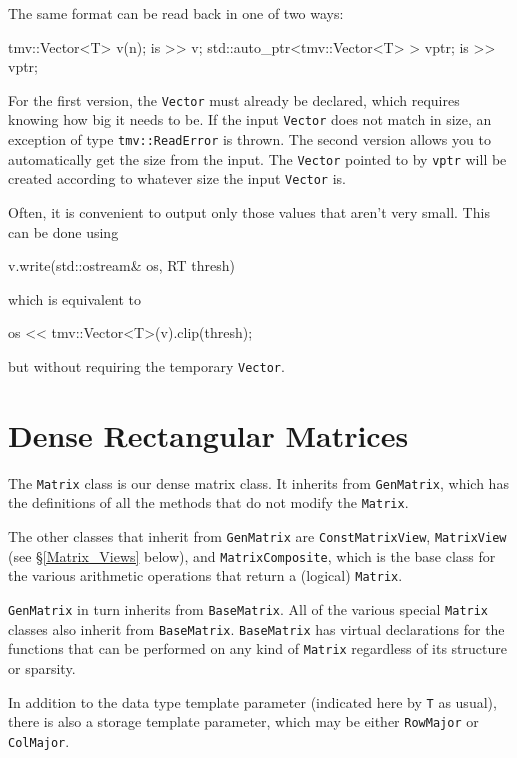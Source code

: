 \documentclass[twoside,letterpaper,11pt]{article}
\renewcommand{\tt}[1]{{\lstinline {#1}}}
\begin{document}
The same format can be read back in one of two ways:
\begin{tmvcode}
tmv::Vector<T> v(n);
is >> v;
std::auto_ptr<tmv::Vector<T> > vptr;
is >> vptr;
\end{tmvcode}
For the first version, the \tt{Vector} must already be declared, which 
requires knowing how big it needs to be.  If the input \tt{Vector} does not
match in size, an exception of type \tt{tmv::ReadError} is thrown.
The second version allows you to automatically get the size from the input.  
The \tt{Vector} pointed to by \tt{vptr}
will be created according to whatever size the input \tt{Vector} is.

Often, it is convenient to output only those values that aren't very small. 
This can be done using
\begin{tmvcode}
v.write(std::ostream& os, RT thresh)
\end{tmvcode}
which is equivalent to
\begin{tmvcode}
os << tmv::Vector<T>(v).clip(thresh);
\end{tmvcode}
but without requiring the temporary \tt{Vector}.

\newpage
\section{Dense Rectangular Matrices}
\label{Matrix}

The \tt{Matrix} class is our dense matrix class.  It inherits from \tt{GenMatrix},
which has the definitions of all the methods that 
do not modify the \tt{Matrix}.

The other classes that inherit from \tt{GenMatrix} are \tt{ConstMatrixView},
\tt{MatrixView} (see \S\ref{Matrix_Views} below), and \tt{MatrixComposite}, which 
is the base class for the various arithmetic operations that return a 
(logical) \tt{Matrix}.  

\tt{GenMatrix} in turn inherits from \tt{BaseMatrix}.  All of the various
special \tt{Matrix} classes also inherit from \tt{BaseMatrix}.
\tt{BaseMatrix} has virtual declarations for the functions that can be 
performed on any kind of \tt{Matrix} regardless of its structure or sparsity.

In addition to the data type template parameter (indicated here by \tt{T} as usual),
there is also a storage template parameter, which may be either 
\tt{RowMajor} or \tt{ColMajor}.
\end{document}
